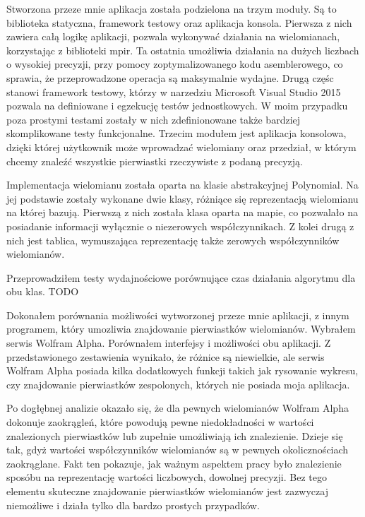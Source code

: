 \documentclass[oneside,a4paper]{book}
\begin{document}
	Stworzona przeze mnie aplikacja została podzielona na trzym moduły. Są to biblioteka statyczna, framework testowy oraz aplikacja konsola. Pierwsza z nich zawiera całą logikę aplikacji, pozwala wykonywać działania na wielomianach, korzystając z biblioteki mpir. Ta ostatnia umożliwia działania na dużych liczbach o wysokiej precyzji, przy pomocy zoptymalizowanego kodu asemblerowego, co sprawia, że przeprowadzone operacja są maksymalnie wydajne. Drugą częśc stanowi framework testowy, którzy w narzedziu Microsoft Visual Studio 2015 pozwala na definiowane i egzekucję testów jednostkowych. W moim przypadku poza prostymi testami zostały w nich zdefinionowane także bardziej skomplikowane testy funkcjonalne. Trzecim modułem jest aplikacja konsolowa, dzięki której użytkownik może wprowadzać wielomiany oraz przedział, w którym chcemy znaleźć wszystkie pierwiastki rzeczywiste z podaną precyzją.
	
	Implementacja wielomianu została oparta na klasie abstrakcyjnej Polynomial. Na jej podstawie zostały wykonane dwie klasy, różniące się reprezentacją wielomianu na której bazują. Pierwszą z nich została klasa oparta na mapie, co pozwalało na posiadanie informacji wyłącznie o niezerowych współczynnikach. Z kolei drugą z nich jest tablica, wymuszająca reprezentację także zerowych współczynników wielomianów.
	
	Przeprowadziłem testy wydajnościowe porównujące czas działania algorytmu dla obu klas. TODO
	
	Dokonałem porównania możliwości wytworzonej przeze mnie aplikacji, z innym programem, który umozliwia znajdowanie pierwiastków wielomianów. Wybrałem serwis Wolfram Alpha. Porównałem interfejsy i możliwości obu aplikacji. Z przedstawionego zestawienia wynikało, że różnice są niewielkie, ale serwis Wolfram Alpha posiada kilka dodatkowych funkcji takich jak rysowanie wykresu, czy znajdowanie pierwiastków zespolonych, których nie posiada moja aplikacja.
	
	Po dogłębnej analizie okazało się, że dla pewnych wielomianów Wolfram Alpha dokonuje zaokrągleń, które powodują pewne niedokładności w wartości znalezionych pierwiastków lub zupełnie umożliwiają ich znalezienie. Dzieje się tak, gdyż wartości współczynników wielomianów są w pewnych okolicznościach zaokrąglane. Fakt ten pokazuje, jak ważnym aspektem pracy było znalezienie sposóbu na reprezentację wartości liczbowych, dowolnej precyzji. Bez tego elementu skuteczne znajdowanie pierwiastków wielomianów jest zazwyczaj niemożliwe i działa tylko dla bardzo prostych przypadków.
	
	\backmatter
	
	
	
	\nocite{barbeau2003polynomials}
	\nocite{buell2004algorithmic}
	\nocite{burden2015numerical}
	\nocite{childs2012concrete}
	\nocite{cormen2004wprowadzenie}
	\nocite{granlund2015gnu}
	\nocite{kryszewski2014wyklad}
	\nocite{malik2009data}
	\nocite{mcnamee2007numerical}
	\nocite{mora2003solving}
	\nocite{pan2012structured}
	\nocite{polskie1968wiadomosci}
	\nocite{sierpinski1951zasady}
	\nocite{Warmus_Mieczyslaw_(1918-2007)_Metody}
	
	
\end{document}
